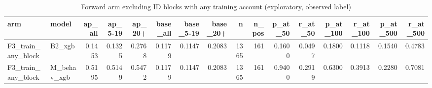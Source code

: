 \begin{table}
\caption{Forward arm excluding ID blocks with any training account (exploratory, observed label)}
\label{tab:tab_f3_sensitivity_final}
\begin{tabular}{llrrrrrrrrrrrrrr}
\toprule
arm & model & ap\_all & ap\_5-19 & ap\_20+ & base\_all & base\_5-19 & base\_20+ & n & n\_pos & p\_at\_50 & r\_at\_50 & p\_at\_100 & r\_at\_100 & p\_at\_500 & r\_at\_500 \\
\midrule
F3\_train\_any\_block & B2\_xgb & 0.1453 & 0.1325 & 0.2768 & 0.1179 & 0.1147 & 0.2083 & 1365 & 161 & 0.1600 & 0.0497 & 0.1800 & 0.1118 & 0.1540 & 0.4783 \\
F3\_train\_any\_block & M\_behav\_xgb & 0.5195 & 0.5149 & 0.5472 & 0.1179 & 0.1147 & 0.2083 & 1365 & 161 & 0.9400 & 0.2919 & 0.6300 & 0.3913 & 0.2280 & 0.7081 \\
\bottomrule
\end{tabular}
\end{table}
